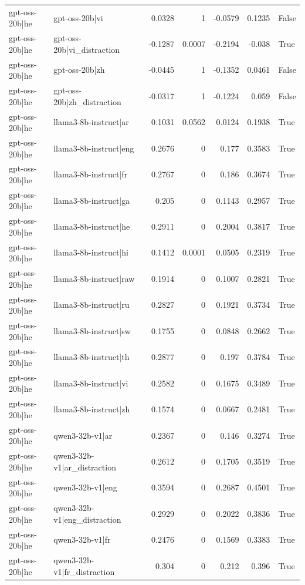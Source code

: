 \begin{table}
\begin{tabular}{l l r r r r l}
gpt-oss-20b|he & gpt-oss-20b|vi & 0.0328 & 1 & -0.0579 & 0.1235 & False \\
gpt-oss-20b|he & gpt-oss-20b|vi_distraction & -0.1287 & 0.0007 & -0.2194 & -0.038 & True \\
gpt-oss-20b|he & gpt-oss-20b|zh & -0.0445 & 1 & -0.1352 & 0.0461 & False \\
gpt-oss-20b|he & gpt-oss-20b|zh_distraction & -0.0317 & 1 & -0.1224 & 0.059 & False \\
gpt-oss-20b|he & llama3-8b-instruct|ar & 0.1031 & 0.0562 & 0.0124 & 0.1938 & True \\
gpt-oss-20b|he & llama3-8b-instruct|eng & 0.2676 & 0 & 0.177 & 0.3583 & True \\
gpt-oss-20b|he & llama3-8b-instruct|fr & 0.2767 & 0 & 0.186 & 0.3674 & True \\
gpt-oss-20b|he & llama3-8b-instruct|ga & 0.205 & 0 & 0.1143 & 0.2957 & True \\
gpt-oss-20b|he & llama3-8b-instruct|he & 0.2911 & 0 & 0.2004 & 0.3817 & True \\
gpt-oss-20b|he & llama3-8b-instruct|hi & 0.1412 & 0.0001 & 0.0505 & 0.2319 & True \\
gpt-oss-20b|he & llama3-8b-instruct|raw & 0.1914 & 0 & 0.1007 & 0.2821 & True \\
gpt-oss-20b|he & llama3-8b-instruct|ru & 0.2827 & 0 & 0.1921 & 0.3734 & True \\
gpt-oss-20b|he & llama3-8b-instruct|sw & 0.1755 & 0 & 0.0848 & 0.2662 & True \\
gpt-oss-20b|he & llama3-8b-instruct|th & 0.2877 & 0 & 0.197 & 0.3784 & True \\
gpt-oss-20b|he & llama3-8b-instruct|vi & 0.2582 & 0 & 0.1675 & 0.3489 & True \\
gpt-oss-20b|he & llama3-8b-instruct|zh & 0.1574 & 0 & 0.0667 & 0.2481 & True \\
gpt-oss-20b|he & qwen3-32b-v1|ar & 0.2367 & 0 & 0.146 & 0.3274 & True \\
gpt-oss-20b|he & qwen3-32b-v1|ar_distraction & 0.2612 & 0 & 0.1705 & 0.3519 & True \\
gpt-oss-20b|he & qwen3-32b-v1|eng & 0.3594 & 0 & 0.2687 & 0.4501 & True \\
gpt-oss-20b|he & qwen3-32b-v1|eng_distraction & 0.2929 & 0 & 0.2022 & 0.3836 & True \\
gpt-oss-20b|he & qwen3-32b-v1|fr & 0.2476 & 0 & 0.1569 & 0.3383 & True \\
gpt-oss-20b|he & qwen3-32b-v1|fr_distraction & 0.304 & 0 & 0.212 & 0.396 & True \\

\end{tabular}
\end{table}
